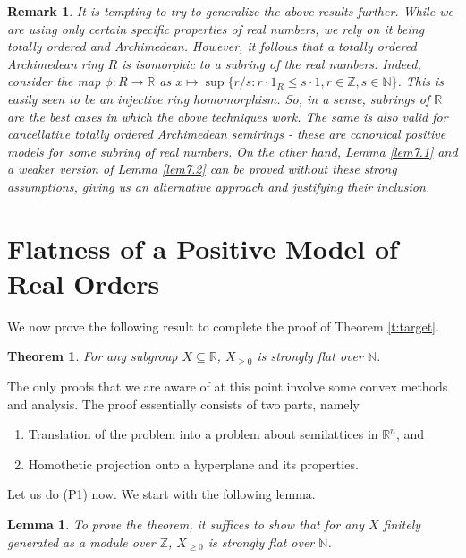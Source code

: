 \documentclass[notitlepage, 10pt]{article}
\theoremstyle{defin}
\theoremstyle{theo}
\newtheorem{thm}[defn]{Theorem}
\newtheorem{lem}{Lemma}[defn]
\theoremstyle{rema}
\newtheorem{rem}{Remark}[section]
\newcommand{\R}{\mathbb{R}}
\newcommand{\N}{\mathbb{N}}
\newcommand{\Z}{\mathbb{Z}}
\begin{document}
\begin{rem}
    It is tempting to try to generalize the above results further. While we are using only certain specific properties of real numbers, we rely on it being totally ordered and Archimedean. However, it follows that a totally ordered Archimedean ring $R$ is isomorphic to a subring of the real numbers. Indeed, consider the map $\phi : R \to \R$ as $x\mapsto \sup \{ r/s :  r\cdot 1_R \leq s\cdot 1, r\in \Z, s\in \N\}$. This is easily seen to be an injective ring homomorphism. So, in a sense, subrings of $\R$ are the best cases in which the above techniques work. The same is also valid for cancellative totally ordered Archimedean semirings - these are canonical positive models for some subring of real numbers. On the other hand, Lemma \ref{lem7.1} and a weaker version of Lemma \ref{lem7.2} can be proved without these strong assumptions, giving us an alternative approach and justifying their inclusion.
\end{rem}

\section{Flatness of a Positive Model of Real Orders}\label{s8}

We now prove the following result to complete the proof of Theorem \ref{t:target}. 

\begin{thm}
    For any subgroup $X\subseteq \R$, $X_{\geq 0}$ is strongly flat over $\N$.
\end{thm}

The only proofs that we are aware of at this point involve some convex methods and analysis. The proof essentially consists of two parts, namely

\begin{enumerate}[label=(P\arabic*)]
    \item Translation of the problem into a problem about semilattices in $\R^n$, and
    \item Homothetic projection onto a hyperplane and its properties.
\end{enumerate}

Let us do (P1) now. We start with the following lemma.

\begin{lem}
    \label{lem8.1}
    To prove the theorem, it suffices to show that for any $X$ finitely generated as a module over $\Z$, $X_{\geq 0}$ is strongly flat over $\N$.
\end{lem}
\end{document}
